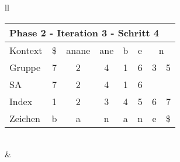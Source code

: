 \begin{table}[H]
\begin{adjustbox}{max width=\textwidth}
\begin{tabular}{ll}
\begin{tabular}{lccccccc}
\multicolumn{8}{l}{Phase 2 - Iteration 3 - Schritt 4}                                                                                                                                                                \\ \hline
\multicolumn{1}{l|}{Kontext} & \multicolumn{1}{c|}{\$} & \multicolumn{1}{c|}{anane} & \multicolumn{1}{c|}{\cellcolor[HTML]{\green}ane} & \multicolumn{1}{c|}{b}    & \multicolumn{1}{c|}{e} & \multicolumn{2}{c}{n} \\
\multicolumn{1}{l|}{Gruppe}  & \multicolumn{1}{c|}{7}  & \multicolumn{1}{c|}{2}     & \multicolumn{1}{c|}{\cellcolor[HTML]{\green}4}   & \multicolumn{1}{c|}{1}    & \multicolumn{1}{c|}{6} & 3         & 5          \\ 
\multicolumn{1}{l|}{SA}      & \multicolumn{1}{c|}{7}  & \multicolumn{1}{c|}{2}     & \multicolumn{1}{c|}{\cellcolor[HTML]{\green}4}   & \multicolumn{1}{c|}{1}    & \multicolumn{1}{c|}{6} &           &            \\ \hline
\multicolumn{1}{l|}{Index}   & 1                       & \cellcolor[HTML]{\red}2  & \cellcolor[HTML]{\blue}3                        & \cellcolor[HTML]{\green}4 & 5                      & 6         & 7          \\
\multicolumn{1}{l|}{Zeichen} & b                       & \cellcolor[HTML]{\red}a  & \cellcolor[HTML]{\blue}n                        & \cellcolor[HTML]{\green}a & n                      & e         & \$        
\end{tabular}

\\
&
\\


\end{tabular}
\end{adjustbox}
\end{table}
